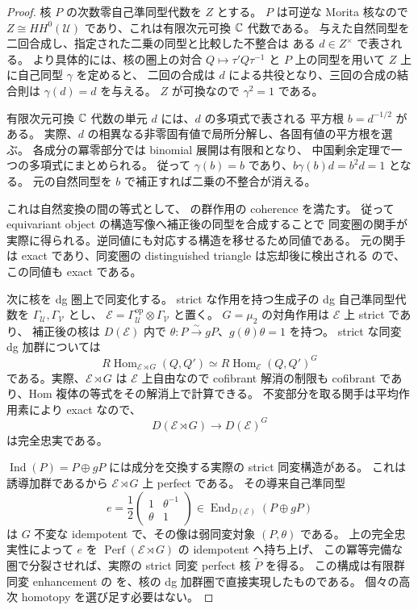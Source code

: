\begin{proof}
核 $P$ の次数零自己準同型代数を $Z$ とする。
$P$ は可逆な Morita 核なので
$Z\cong HH^0(\mathcal U)$ であり、これは有限次元可換 $\mathbb C$ 代数である。
与えた自然同型を二回合成し、指定された二乗の同型と比較した不整合は
ある $d\in Z^\times$ で表される。
より具体的には、核の圏上の対合
$Q\mapsto\tau'Q\tau^{-1}$ と $P$ 上の同型を用いて
$Z$ 上に自己同型 $\gamma$ を定めると、
二回の合成は $d$ による共役となり、三回の合成の結合則は
$\gamma(d)=d$ を与える。
$Z$ が可換なので $\gamma^2=1$ である。

有限次元可換 $\mathbb C$ 代数の単元 $d$ には、$d$ の多項式で表される
平方根 $b=d^{-1/2}$ がある。
実際、$d$ の相異なる非零固有値で局所分解し、各固有値の平方根を選ぶ。
各成分の冪零部分では binomial 展開は有限和となり、
中国剰余定理で一つの多項式にまとめられる。
従って $\gamma(b)=b$ であり、$b\gamma(b)d=b^2d=1$ となる。
元の自然同型を $b$ で補正すれば二乗の不整合が消える。

これは自然変換の間の等式として、
\cite[Definition~3.1]{MEDElagin}の群作用の coherence を満たす。
従って equivariant object の構造写像へ補正後の同型を合成することで
同変圏の関手が実際に得られる。逆同値にも対応する構造を移せるため同値である。
元の関手は exact であり、同変圏の distinguished triangle は忘却後に検出される
\cite[Definition~6.1 and Corollary~6.10]{MEDElagin}ので、この同値も exact である。

次に核を dg 圏上で同変化する。
strict な作用を持つ生成子の dg 自己準同型代数を
$\Gamma_{\mathcal U},\Gamma_{\mathcal V}$ とし、
$\mathscr E=\Gamma_{\mathcal U}^{\mathrm{op}}\otimes\Gamma_{\mathcal V}$ と置く。
$G=\mu_2$ の対角作用は $\mathscr E$ 上 strict であり、
補正後の核は $D(\mathscr E)$ 内で
$\theta:P\xrightarrow{\sim}gP$、$g(\theta)\theta=1$ を持つ。
strict な同変 dg 加群については
\[
 R\operatorname{Hom}_{\mathscr E\rtimes G}(Q,Q')
 \simeq R\operatorname{Hom}_{\mathscr E}(Q,Q')^G
\]
である。実際、$\mathscr E\rtimes G$ は $\mathscr E$ 上自由なので
cofibrant 解消の制限も cofibrant であり、Hom 複体の等式をその解消上で計算できる。
不変部分を取る関手は平均作用素により exact なので、
\[
 D(\mathscr E\rtimes G)\longrightarrow D(\mathscr E)^G
\]
は完全忠実である。

$\operatorname{Ind}(P)=P\oplus gP$ には成分を交換する実際の strict 同変構造がある。
これは誘導加群であるから $\mathscr E\rtimes G$ 上 perfect である。
その導来自己準同型
\begin{equation}
\label{cmo:eq:root-order-equivariant-kernel-projector}
 e=\frac12
 \begin{pmatrix}1&\theta^{-1}\\\theta&1\end{pmatrix}
 \in\operatorname{End}_{D(\mathscr E)}(P\oplus gP)
\end{equation}
は $G$ 不変な idempotent で、その像は弱同変対象 $(P,\theta)$ である。
上の完全忠実性によって $e$ を
$\operatorname{Perf}(\mathscr E\rtimes G)$ の idempotent へ持ち上げ、
この冪等完備な圏で分裂させれば、実際の strict 同変 perfect 核 $\widetilde P$ を得る。
この構成は有限群同変 enhancement の
\cite[Theorems~8.7 and~8.9]{MEDElagin}を、核の dg 加群圏で直接実現したものである。
個々の高次 homotopy を選び足す必要はない。


\end{proof}
